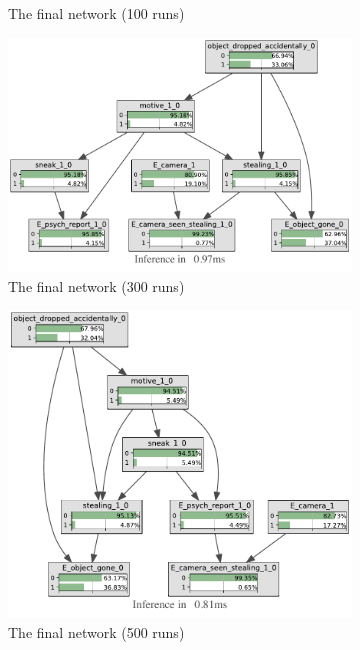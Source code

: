 \documentclass[12pt]{article}
\begin{document}
\begin{figure}[htbp]
\begin{center}
\begin{subfigure}{0.45\textwidth}
\caption{The final network (100 runs)}
\end{subfigure}
\begin{subfigure}{0.45\textwidth}
\includegraphics[width=\linewidth]{GroteMarktPrivate/bnImage/BNIMAGEGroteMarktPrivate300.pdf}
\caption{The final network (300 runs)}
\end{subfigure}
\begin{subfigure}{0.45\textwidth}
\includegraphics[width=\linewidth]{GroteMarktPrivate/bnImage/BNIMAGEGroteMarktPrivate500.pdf}
\caption{The final network (500 runs)}
\end{subfigure}
\begin{subfigure}{0.45\textwidth}

\end{subfigure}
\end{center}
\end{figure}
\end{document}
